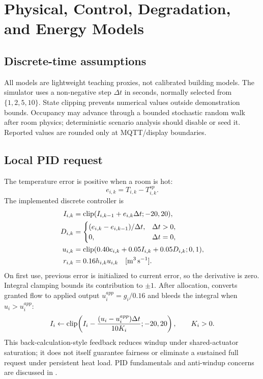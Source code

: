 \chapter{Physical, Control, Degradation, and Energy Models}
\label{ch:physics}

\section{Discrete-time assumptions}
All models are lightweight teaching proxies, not calibrated building models. The simulator uses a non-negative step $\Delta t$ in seconds, normally selected from $\{1,2,5,10\}$. State clipping prevents numerical values outside demonstration bounds. Occupancy may advance through a bounded stochastic random walk after room physics; deterministic scenario analysis should disable or seed it. Reported values are rounded only at MQTT/display boundaries.

\section{Local PID request}
The temperature error is positive when a room is hot:
\begin{equation}e_{i,k}=T_{i,k}-T^{sp}_{i,k}.\end{equation}
The implemented discrete controller is
\begin{align}
I_{i,k}&=\operatorname{clip}(I_{i,k-1}+e_{i,k}\Delta t;-20,20),\\
D_{i,k}&=\begin{cases}(e_{i,k}-e_{i,k-1})/\Delta t,&\Delta t>0,\\0,&\Delta t=0,\end{cases}\\
u_{i,k}&=\operatorname{clip}(0.40e_{i,k}+0.05I_{i,k}+0.05D_{i,k};0,1),\\
r_{i,k}&=0.16h_{i,k}u_{i,k}\quad [\si{\meter\cubed\per\second}].
\end{align}
On first use, previous error is initialized to current error, so the derivative is zero. Integral clamping bounds its contribution to $\pm1$. After allocation,  converts granted flow to applied output $u_i^{app}=g_i/0.16$ and bleeds the integral when $u_i>u_i^{app}$:
\begin{equation}I_i\leftarrow\operatorname{clip}\!\left(I_i-\frac{(u_i-u_i^{app})\Delta t}{10K_i};-20,20\right),\qquad K_i>0.\end{equation}
This back-calculation-style feedback reduces windup under shared-actuator saturation; it does not itself guarantee fairness or eliminate a sustained full request under persistent heat load. PID fundamentals and anti-windup concerns are discussed in \citet{astrom2006advanced}.

